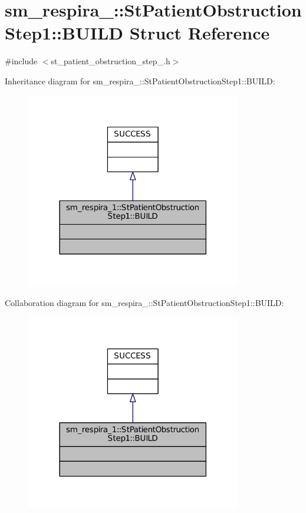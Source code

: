\hypertarget{structsm__respira__1_1_1StPatientObstructionStep1_1_1BUILD}{}\section{sm\+\_\+respira\+\_\+:\+:St\+Patient\+Obstruction\+Step1\+:\+:B\+U\+I\+LD Struct Reference}
\label{structsm__respira__1_1_1StPatientObstructionStep1_1_1BUILD}


{\ttfamily \#include $<$st\+\_\+patient\+\_\+obstruction\+\_\+step\+\_.\+h$>$}



Inheritance diagram for sm\+\_\+respira\+\_\+:\+:St\+Patient\+Obstruction\+Step1\+:\+:B\+U\+I\+LD\+:
\nopagebreak
\begin{figure}[H]
\begin{center}
\leavevmode
\includegraphics[width=266pt]{structsm__respira__1_1_1StPatientObstructionStep1_1_1BUILD__inherit__graph}
\end{center}
\end{figure}


Collaboration diagram for sm\+\_\+respira\+\_\+:\+:St\+Patient\+Obstruction\+Step1\+:\+:B\+U\+I\+LD\+:
\nopagebreak
\begin{figure}[H]
\begin{center}
\leavevmode
\includegraphics[width=266pt]{structsm__respira__1_1_1StPatientObstructionStep1_1_1BUILD__coll__graph}
\end{center}
\end{figure}


